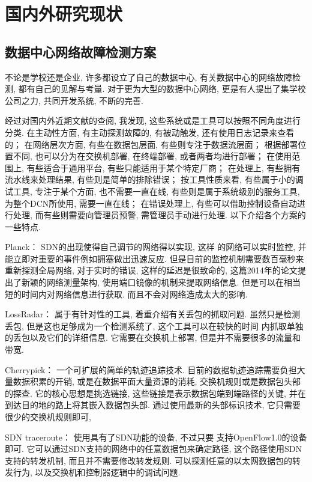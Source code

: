 \chapter{国内外研究现状}
\section{数据中心网络故障检测方案}

不论是学校还是企业, 许多都设立了自己的数据中心,
有关数据中心的网络故障检测, 都有自己的见解与考量. 对于更为大型的数据中心网络,
更是有人提出了集学校公司之力, 共同开发系统, 不断的完善.

经过对国内外近期文献的查阅, 我发现,
这些系统或是工具可以按照不同角度进行分类. 在主动性方面,
有主动探测故障的, 有被动触发, 还有使用日志记录来查看的； 在网络层次方面,
有些在数据包层面, 有些则专注于数据流层面； 根据部署位置不同,
也可以分为在交换机部署, 在终端部署, 或者两者均进行部署； 在使用范围上,
有些适合于通用平台, 有些只能适用于某个特定厂商； 在处理上,
有些拥有流水线来处理结果, 有些则是简单的排除错误； 按工具性质来看,
有些属于小的调试工具, 专注于某个方面, 也不需要一直在线,
有些则是属于系统级别的服务工具, 为整个DCN所使用, 需要一直在线；
在错误处理上, 有些可以借助控制设备自动进行处理,
而有些则需要向管理员预警, 需管理员手动进行处理. 以下介绍各个方案的一些特点.

Planck：\cite{rasley2014planck} SDN的出现使得自己调节的网络得以实现, 这样
的网络可以实时监控, 并能立即对重要的事件例如拥塞做出迅速反应.
但是目前的监控机制需要数百毫秒来重新探测全局网络, 对于实时的错误,
这样的延迟是很致命的, 这篇2014年的论文提出了新颖的网络测量架构,
使用端口镜像的机制来提取网络信息. 但是可以在相当
短的时间内对网络信息进行获取. 而且不会对网络造成太大的影响.

LossRadar：\cite{li2016lossradar} 属于有针对性的工具,
着重介绍有关丢包的抓取问题. 虽然只是检测丢包,
但是这也足够成为一个检测系统了, 这个工具可以在较快的时间
内抓取单独的丢包以及它们的详细信息. 它需要在交换机上部署,
但是并不需要很多的流量和带宽.

Cherrypick：\cite{tammana2015cherrypick} 一个可扩展的简单的轨迹追踪技术.
目前的数据轨迹追踪需要负担大量数据积累的开销,
或是在数据平面大量资源的消耗, 交换机规则或是数据包头部的探查.
它的核心思想是挑选链接, 这些链接是表示数据包端到端路径的关键,
并在到达目的地的路上将其嵌入数据包头部. 通过使用最新的头部标识技术,
它只需要很少的交换机规则即可,

SDN traceroute：\cite{agarwal2014sdn} 使用具有了SDN功能的设备, 不过只要
支持OpenFlow1.0的设备即可. 它可以通过SDN支持的网络中的任意数据包来确定路径,
这个路径使用SDN支持的转发机制, 而且并不需要修改转发规则.
可以探测任意的以太网数据包的转发行为, 以及交换机和控制器逻辑中的调试问题.

